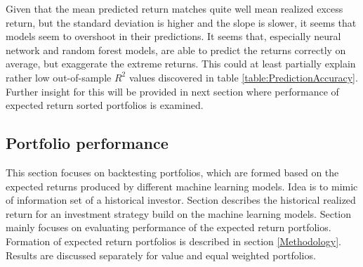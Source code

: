 \documentclass{article}
\begin{document}
Given that the mean predicted return matches quite well mean realized excess return, but the standard deviation is higher and the slope is slower, it seems that models seem to overshoot in their predictions. It seems that, especially neural network and random forest models, are able to predict the returns correctly on average, but exaggerate the extreme returns. This could at least partially explain rather low out-of-sample $R^2$ values discovered in table \ref{table:PredictionAccuracy}. Further insight for this will be provided in next section where performance of expected return sorted portfolios is examined.

\subsection{Portfolio performance}

This section focuses on backtesting portfolios, which are formed based on the expected returns produced by different machine learning models. Idea is to mimic of information set of a historical investor. Section describes the historical realized return for an investment strategy build on the machine learning models. Section mainly focuses on evaluating performance of the expected return portfolios. Formation of expected return portfolios is described in section \ref{Methodology}. Results are discussed separately for value and equal weighted portfolios. 
\end{document}

